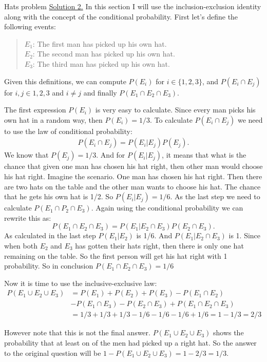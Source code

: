 \begin{example}{Hats problem}
	\underline{Solution 2.} In this section I will use the inclusion-exclusion identity along with the concept of the conditional probability. First let's define the following events:
	\begin{quote}
		$ E_1 $: The first man has picked up his own hat. \\
		$ E_2 $: The second man has picked up his own hat. \\
		$ E_3 $: The third man has picked up his own hat. 
	\end{quote}
	
	Given this definitions, we can compute $ P(E_i) $ for $ i \in \{1,2,3\} $, and $ P(E_i \cap E_j) $ for $ i,j \in {1,2,3} $ and $ i \neq j $ and finally $ P(E_1 \cap E_2 \cap E_3) $.
	
	The first expression $ P(E_i) $ is very easy to calculate. Since every man picks his own hat in a random way, then $ P(E_i) = 1/3 $. To calculate $ P(E_i \cap E_j) $ we need to use the law of conditional probability: 
	\begin{align*}
		P(E_i \cap E_j) = P(E_i | E_j) P(E_j).
	\end{align*}
	We know that $ P(E_j) = 1/3 $. And for $ P(E_i | E_j) $, it means that what is the chance that given one man has chosen his hat right, then other man would choose his hat right. Imagine the scenario. One man has chosen his hat right. Then there are two hats on the table and the other man wants to choose his hat. The chance that he gets his own hat is 1/2. So $ P(E_i | E_j)  = 1/6 $.
	As the last step we need to calculate $ P(E_1 \cap P_2 \cap E_3) $. Again using the conditional probability we can rewrite this as: 
	\[ P(E_1 \cap E_2 \cap E_3) = P(E_1 | E_2 \cap E_3) P(E_2 \cap E_3). \]
	As calculated in the last step $ P(E_1 | E_2) $ is 1/6. And $ P(E_1 | E_2 \cap E_3) $ is 1. Since when both $ E_2 $ and $ E_3 $ has gotten their hats right, then there is only one hat remaining on the table. So the first person will get his hat right with 1 probability. So in conclusion $ P(E_1 \cap E_2 \cap E_3) = 1/6 $
	
	Now it is time to use the inclusive-exclusive law: 
	\begin{align*}
		P(E_1 \cup E_2 \cup E_3) &= P(E_1) + P(E_2) + P(E_3) - P(E_1 \cap E_2) \\
		& - P(E_1 \cap E_3) - P(E_2 \cap E_3) + P(E_1 \cap E_2 \cap E_3) \\
		& =1/3 + 1/3 + 1/3 - 1/6 - 1/6 - 1/6 + 1/6 = 1 - 1/3 = 2/3
	\end{align*}
	
	However note that this is not the final answer. $ P(E_1 \cup E_2 \cup E_3) $ shows the probability that at least on of the men had picked up a right hat. So the answer to the original question will be $ 1-P(E_1 \cup E_2 \cup E_3) = 1-2/3 = 1/3. $
	
\end{example}


